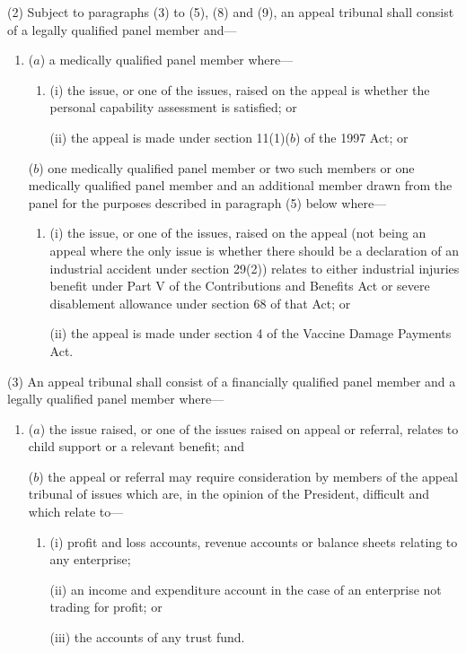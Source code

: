 \documentclass[12pt,a4paper]{article}
\begin{document}
(2) Subject to 
paragraphs (3) to (5), (8) and (9),  %
an appeal tribunal shall consist of a legally qualified panel member and—
\begin{enumerate}\item[]
($a$) a medically qualified panel member where—
\begin{enumerate}\item[]
(i) the issue, or one of the issues, raised on the appeal is whether the 
personal capability assessment  %
is satisfied; or

(ii) the appeal is made under section 11(1)($b$) of the 1997 Act; or
\end{enumerate}

($b$) one medically qualified panel member or two such members or one medically qualified panel member and an additional member drawn from the panel for the purposes described in paragraph (5) below where—
\begin{enumerate}\item[]
(i) the issue, or one of the issues, raised on the appeal 
(not being an appeal where the only issue is whether there should be a declaration of an industrial accident under section 29(2))  %
relates to either industrial injuries benefit under Part V of the Contributions and Benefits Act or severe disablement allowance under section 68 of that Act; or

\enlargethispage{\baselineskip}

(ii) the appeal is made under section 4 of the Vaccine Damage Payments Act.
\end{enumerate}
\end{enumerate}

\pagebreak[3]

(3) An appeal tribunal shall consist of a financially qualified panel member and a legally qualified panel member where—
\begin{enumerate}\item[]
($a$) the issue raised, or one of the issues raised on appeal or referral, relates to child support or a relevant benefit; and

\pagebreak[3]

($b$) the appeal or referral may require consideration by members of the appeal tribunal of issues which are, in the opinion of the President, difficult and which relate to—
\begin{enumerate}\item[]
(i) profit and loss accounts, revenue accounts or balance sheets relating to any enterprise;

(ii) an income and expenditure account in the case of an enterprise not trading for profit; or

(iii) the accounts of any trust fund.
\end{enumerate}
\end{enumerate}
\end{document}
